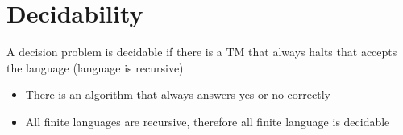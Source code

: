 \chapter{Decidability}

A decision problem is decidable if there is a TM that always halts that accepts
the language (language is recursive)

\begin{itemize}
  \item There is an algorithm that always answers yes or no correctly
  \item All finite languages are recursive, therefore all finite language is
  decidable
\end{itemize}
